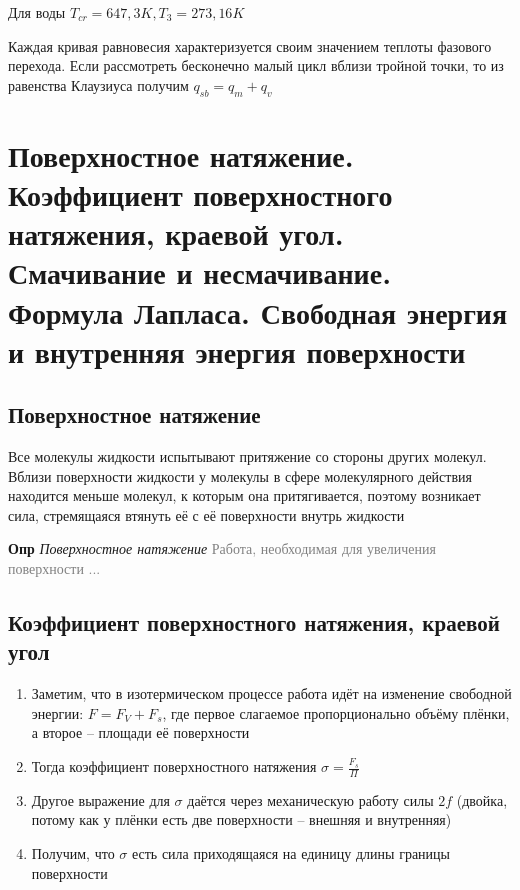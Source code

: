 \documentclass[a4paper, 14pt]{article}
\begin{document}
    Для воды $T_{cr} = 647,3 K, T_3 = 273,16 K$

    Каждая кривая равновесия характеризуется своим значением теплоты фазового перехода.
    Если рассмотреть бесконечно малый цикл вблизи тройной точки, то из равенства Клаузиуса получим $q_{sb} = q_m + q_{v}$

    \section{Поверхностное натяжение.
    Коэффициент поверхностного натяжения, краевой угол.
    Смачивание и несмачивание.
    Формула Лапласа.
    Свободная энергия и внутренняя энергия поверхности}

    \subsection{Поверхностное натяжение}

    Все молекулы жидкости испытывают притяжение со стороны других молекул.
    Вблизи поверхности жидкости у молекулы в сфере молекулярного действия находится меньше молекул, к которым она
    притягивается, поэтому возникает сила, стремящаяся втянуть её с её поверхности внутрь жидкости

    \textbf{Опр} \textit{Поверхностное натяжение} \textcolor{gray}{Работа, необходимая для увеличения поверхности ...}

    \subsection{Коэффициент поверхностного натяжения, краевой угол}

    \begin{enumerate}
        \item Заметим, что в изотермическом процессе работа идёт на изменение свободной энергии: $F = F_V + F_s$, где
        первое слагаемое пропорционально объёму плёнки, а второе -- площади её поверхности
        \item Тогда коэффициент поверхностного натяжения $\sigma = \frac{F_s}{\Pi}$
        \item Другое выражение для $\sigma$ даётся через механическую работу силы $2f$ (двойка, потому как у плёнки
        есть две поверхности -- внешняя и внутренняя)
        \item Получим, что $\sigma$ есть сила приходящаяся на единицу длины границы поверхности
    \end{enumerate}
\end{document}
